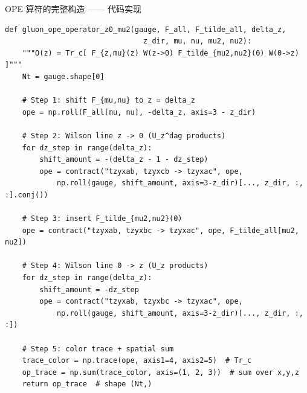 \documentclass[10pt,aspectratio=169]{beamer}
\begin{document}
\begin{frame}[fragile]{OPE 算符的完整构造 —— 代码实现}
\begin{lstlisting}
def gluon_ope_operator_z0_mu2(gauge, F_all, F_tilde_all, delta_z,
                                z_dir, mu, nu, mu2, nu2):
    """O(z) = Tr_c[ F_{z,mu}(z) W(z->0) F_tilde_{mu2,nu2}(0) W(0->z) ]"""
    Nt = gauge.shape[0]

    # Step 1: shift F_{mu,nu} to z = delta_z
    ope = np.roll(F_all[mu, nu], -delta_z, axis=3 - z_dir)

    # Step 2: Wilson line z -> 0 (U_z^dag products)
    for dz_step in range(delta_z):
        shift_amount = -(delta_z - 1 - dz_step)
        ope = contract("tzyxab, tzyxcb -> tzyxac", ope,
            np.roll(gauge, shift_amount, axis=3-z_dir)[..., z_dir, :, :].conj())

    # Step 3: insert F_tilde_{mu2,nu2}(0)
    ope = contract("tzyxab, tzyxbc -> tzyxac", ope, F_tilde_all[mu2, nu2])

    # Step 4: Wilson line 0 -> z (U_z products)
    for dz_step in range(delta_z):
        shift_amount = -dz_step
        ope = contract("tzyxab, tzyxbc -> tzyxac", ope,
            np.roll(gauge, shift_amount, axis=3-z_dir)[..., z_dir, :, :])

    # Step 5: color trace + spatial sum
    trace_color = np.trace(ope, axis1=4, axis2=5)  # Tr_c
    op_trace = np.sum(trace_color, axis=(1, 2, 3))  # sum over x,y,z
    return op_trace  # shape (Nt,)
\end{lstlisting}
\end{frame}
\end{document}
